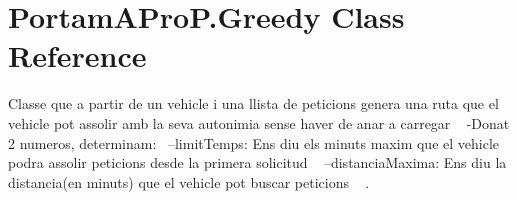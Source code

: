 \hypertarget{class_portam_a_pro_p_1_1_greedy}{}\section{Portam\+A\+Pro\+P.\+Greedy Class Reference}
\label{class_portam_a_pro_p_1_1_greedy}


Classe que a partir de un vehicle i una llista de peticions genera una ruta que el vehicle pot assolir amb la seva autonimia sense haver de anar a carregar ~\newline
-\/\+Donat 2 numeros, determinam\+:~\newline
--limit\+Temps\+: Ens diu els minuts maxim que el vehicle podra assolir peticions desde la primera solicitud ~\newline
--distancia\+Maxima\+: Ens diu la distancia(en minuts) que el vehicle pot buscar peticions ~\newline
.  


